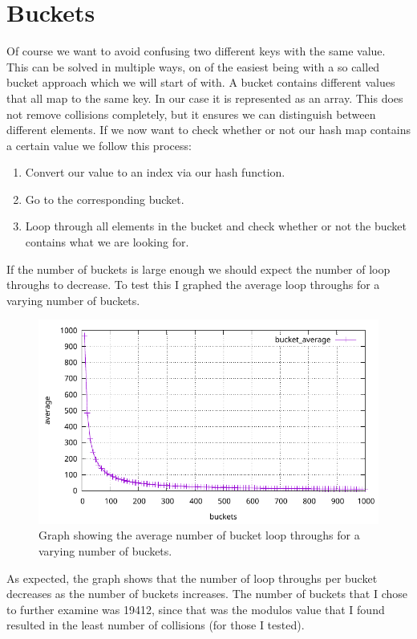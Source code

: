 \documentclass[a4paper, 11pt]{article}
\begin{document}
\section{Buckets}
	Of course we want to avoid confusing two different keys with the same value.
	This can be solved in multiple ways, on of the easiest being with a so called bucket approach which we will start of with.
	A bucket contains different values that all map to the same key.
	In our case it is represented as an array.
	This does not remove collisions completely, but it ensures we can distinguish between different elements.
	If we now want to check whether or not our hash map contains a certain value we follow this process:
	\begin{enumerate}
		\item Convert our value to an index via our hash function.
		\item Go to the corresponding bucket.
		\item Loop through all elements in the bucket and check whether or not the bucket contains what we are looking for.
	\end{enumerate}
	If the number of buckets is large enough we should expect the number of loop throughs to decrease.
	To test this I graphed the average loop throughs for a varying number of buckets.
	\begin{figure}[H]
		\centering
		\includegraphics[scale=0.8]{graphs/bucket_average.pdf}
		\caption{
			Graph showing the average number of bucket loop throughs for a varying number of buckets.
		}
	\end{figure}
	As expected, the graph shows that the number of loop throughs per bucket decreases as the number of buckets increases.
	The number of buckets that I chose to further examine was 19412, since that was the modulos value that I found resulted in the least number of collisions (for those I tested).
\end{document}
